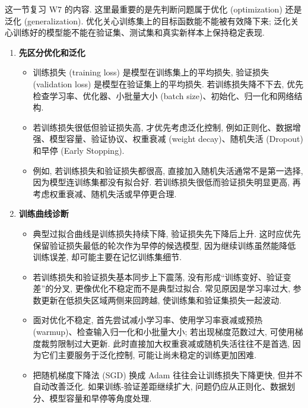\documentclass{../nndlcourse}
\begin{document}
这一节复习 W7 的内容. 这里最重要的是先判断问题属于优化 (optimization) 还是泛化 (generalization). 优化关心训练集上的目标函数能不能被有效降下来; 泛化关心训练好的模型能不能在验证集、测试集和真实新样本上保持稳定表现.

\begin{enumerate}
    \item \textbf{先区分优化和泛化}
    \begin{itemize}
        \item 训练损失 (training loss) 是模型在训练集上的平均损失, 验证损失 (validation loss) 是模型在验证集上的平均损失. 若训练损失降不下去, 优先检查学习率、优化器、小批量大小 (batch size)、初始化、归一化和网络结构.
        \item 若训练损失很低但验证损失高, 才优先考虑泛化控制, 例如正则化、数据增强、模型容量、验证协议、权重衰减 (weight decay)、随机失活 (Dropout) 和早停 (Early Stopping).
        \item 例如, 若训练损失和验证损失都很高, 直接加入随机失活通常不是第一选择, 因为模型连训练集都没有拟合好. 若训练损失很低而验证损失明显更高, 再考虑权重衰减、随机失活或早停更合理.
    \end{itemize}

    \item \textbf{训练曲线诊断}
    \begin{itemize}
        \item 典型过拟合曲线是训练损失持续下降, 验证损失先下降后上升. 这时应优先保留验证损失最低的轮次作为早停的候选模型, 因为继续训练虽然能降低训练误差, 却可能主要在记忆训练集细节.
        \item 若训练损失和验证损失基本同步上下震荡, 没有形成“训练变好、验证变差”的分叉, 更像优化不稳定而不是典型过拟合. 常见原因是学习率过大, 参数更新在低损失区域两侧来回跨越, 使训练集和验证集损失一起波动.
        \item 面对优化不稳定, 首先尝试减小学习率、使用学习率衰减或预热 (warmup)、检查输入归一化和小批量大小; 若出现梯度范数过大, 可使用梯度裁剪限制过大更新. 此时直接加大权重衰减或随机失活往往不是首选, 因为它们主要服务于泛化控制, 可能让尚未稳定的训练更加困难.
        \item 把随机梯度下降法 (SGD) 换成 Adam 往往会让训练损失下降更快, 但并不自动改善泛化. 如果训练-验证差距继续扩大, 问题仍应从正则化、数据划分、模型容量和早停等角度处理.
    \end{itemize}


\end{enumerate}
\end{document}
